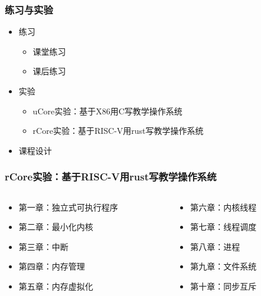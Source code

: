 \documentclass[UTF8]{ctexbeamer}
\begin{document}
    \begin{frame}
        \frametitle{练习与实验}
        \begin{itemize}
            \item 练习
        \begin{itemize}
    		\item 课堂练习
	    	\item 课后练习
        \end{itemize}

            \item 实验
    \begin{itemize}
		\item uCore实验：基于X86用C写教学操作系统
		\item rCore实验：基于RISC-V用rust写教学操作系统
    \end{itemize}
            \item 课程设计
        \end{itemize}
\end{frame}

\begin{frame}
\frametitle{rCore实验：基于RISC-V用rust写教学操作系统}
\begin{columns}
\begin{column}{0.5\textwidth}
\begin{itemize}
		\item 第一章：独立式可执行程序
		\item 第二章：最小化内核
		\item 第三章：中断
		\item 第四章：内存管理
		\item 第五章：内存虚拟化
\end{itemize}
\end{column}
 
\begin{column}{0.5\textwidth}
    \begin{itemize}
		\item 第六章：内核线程
		\item 第七章：线程调度
		\item 第八章：进程
		\item 第九章：文件系统
		\item 第十章：同步互斥
    \end{itemize}
\end{column}

\end{columns}
\end{frame}
\end{document}
